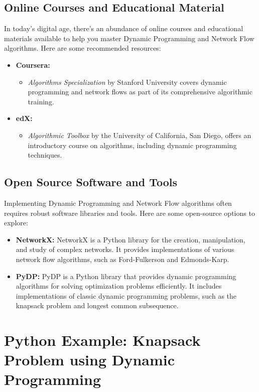 \documentclass[12pt]{book} %
\begin{document}
\subsection{Online Courses and Educational Material}
In today's digital age, there's an abundance of online courses and educational materials available to help you master Dynamic Programming and Network Flow algorithms. Here are some recommended resources:

\begin{itemize}
    \item \textbf{Coursera:}
    \begin{itemize}
        \item \textit{Algorithms Specialization} by Stanford University covers dynamic programming and network flows as part of its comprehensive algorithmic training.
    \end{itemize}
    \item \textbf{edX:}
    \begin{itemize}
        \item \textit{Algorithmic Toolbox} by the University of California, San Diego, offers an introductory course on algorithms, including dynamic programming techniques.
    \end{itemize}
\end{itemize}

\subsection{Open Source Software and Tools}
Implementing Dynamic Programming and Network Flow algorithms often requires robust software libraries and tools. Here are some open-source options to explore:

\begin{itemize}
    \item \textbf{NetworkX:} NetworkX is a Python library for the creation, manipulation, and study of complex networks. It provides implementations of various network flow algorithms, such as Ford-Fulkerson and Edmonds-Karp.
    \item \textbf{PyDP:} PyDP is a Python library that provides dynamic programming algorithms for solving optimization problems efficiently. It includes implementations of classic dynamic programming problems, such as the knapsack problem and longest common subsequence.
\end{itemize}

\FloatBarrier
\section*{Python Example: Knapsack Problem using Dynamic Programming}
\end{document}
